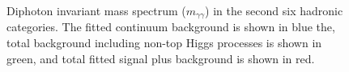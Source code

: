 \begin{figure}[htbp]
  \caption{Diphoton invariant mass spectrum ($m_{\gamma\gamma}$) in the second six hadronic categories. The fitted continuum background is shown in blue the, total background including non-top Higgs processes is shown in green, and total fitted signal plus background is shown in red.}
  \label{fig:invmass_had2}
\end{figure}

